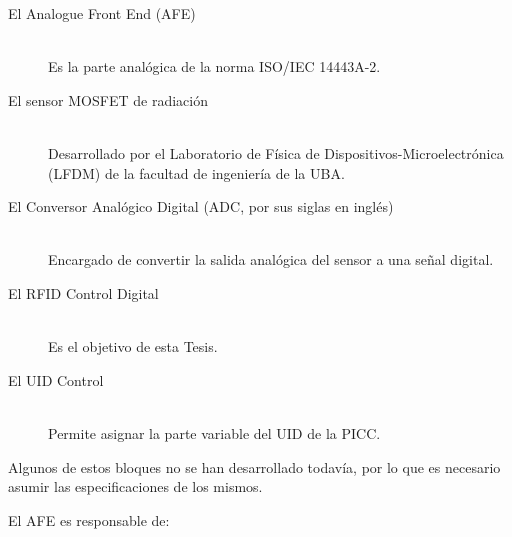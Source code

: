 \documentclass[a4paper, twoside, 11pt]{report}
\begin{document}
\begin{description}
  \item[El Analogue Front End (AFE)] \hfill \\ Es la parte analógica de la norma ISO/IEC 14443A-2.
  \item[El sensor MOSFET de radiación] \hfill \\ Desarrollado por el Laboratorio de Física de Dispositivos-Microelectrónica (LFDM) de la facultad de ingeniería de la UBA.
  \item[El Conversor Analógico Digital (ADC, por sus siglas en inglés)] \hfill \\ Encargado de convertir la salida analógica del sensor a una señal digital.
  \item[El RFID Control Digital] \hfill \\ Es el objetivo de esta Tesis.
  \item[El UID Control] \hfill \\ Permite asignar la parte variable del UID de la PICC.
\end{description}

Algunos de estos bloques no se han desarrollado todavía, por lo que es necesario asumir las especificaciones de los mismos.

El AFE es responsable de:
\end{document}
